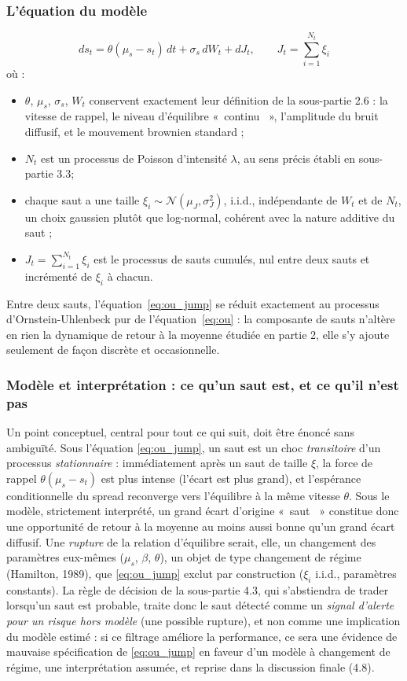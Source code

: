 \documentclass{article}
\providecommand{\og}{«~}
\providecommand{\fg}{~»}
\begin{document}
\subsubsection*{L'équation du modèle}
\begin{equation}
ds_t = \theta(\mu_s-s_t)\,dt + \sigma_s\,dW_t + dJ_t, \qquad J_t = \sum_{i=1}^{N_t} \xi_i
\label{eq:ou_jump}
\end{equation}
où :
\begin{itemize}
\item $\theta$, $\mu_s$, $\sigma_s$, $W_t$ conservent exactement leur définition de la sous-partie 2.6 : la vitesse de rappel, le niveau d'équilibre \og continu \fg, l'amplitude du bruit diffusif, et le mouvement brownien standard ;
\item $N_t$ est un processus de Poisson d'intensité $\lambda$, au sens précis établi en sous-partie 3.3;
\item chaque saut a une taille $\xi_i \sim \mathcal{N}(\mu_J,\sigma_J^2)$, i.i.d., indépendante de $W_t$ et de $N_t$, un choix gaussien plutôt que log-normal, cohérent avec la nature additive du saut ;
\item $J_t = \sum_{i=1}^{N_t}\xi_i$ est le processus de sauts cumulés, nul entre deux sauts et incrémenté de $\xi_i$ à chacun.
\end{itemize}
Entre deux sauts, l'équation~\eqref{eq:ou_jump} se réduit exactement au processus d'Ornstein-Uhlenbeck pur de l'équation~\eqref{eq:ou} : la composante de sauts n'altère en rien la dynamique de retour à la moyenne étudiée en partie 2, elle s'y ajoute seulement de façon discrète et occasionnelle. 

\subsubsection*{Modèle et interprétation : ce qu'un saut est, et ce qu'il n'est pas}
Un point conceptuel, central pour tout ce qui suit, doit être énoncé sans ambiguïté. Sous l'équation \eqref{eq:ou_jump}, un saut est un choc \emph{transitoire} d'un processus \emph{stationnaire} : immédiatement après un saut de taille $\xi$, la force de rappel $\theta(\mu_s-s_t)$ est plus intense (l'écart est plus grand), et l'espérance conditionnelle du spread reconverge vers l'équilibre à la même vitesse $\theta$. Sous le modèle, strictement interprété, un grand écart d'origine \og saut \fg{} constitue donc une opportunité de retour à la moyenne au moins aussi bonne qu'un grand écart diffusif. Une \emph{rupture} de la relation d'équilibre serait, elle, un changement des paramètres eux-mêmes ($\mu_s$, $\beta$, $\theta$), un objet de type changement de régime (Hamilton, 1989), que \eqref{eq:ou_jump} exclut par construction ($\xi_i$ i.i.d., paramètres constants). La règle de décision de la sous-partie 4.3, qui s'abstiendra de trader lorsqu'un saut est probable, traite donc le saut détecté comme un \emph{signal d'alerte pour un risque hors modèle} (une possible rupture), et non comme une implication du modèle estimé : si ce filtrage améliore la performance, ce sera une évidence de mauvaise spécification de \eqref{eq:ou_jump} en faveur d'un modèle à changement de régime, une interprétation assumée, et reprise dans la discussion finale (4.8).
\end{document}
